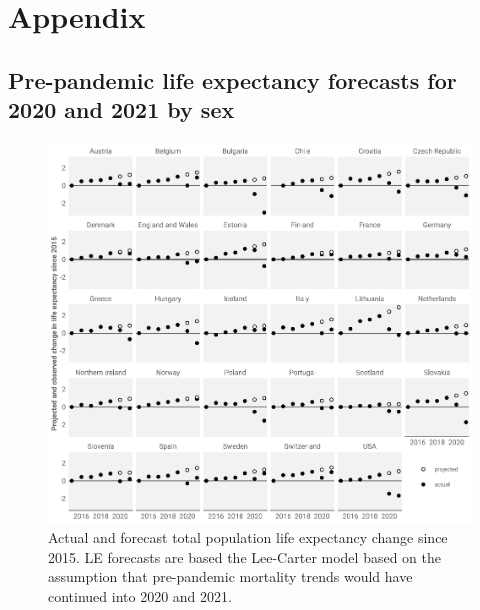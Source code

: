 \documentclass[12pt]{article}
\begin{document}
\clearpage
\section*{Appendix}

\renewcommand\thefigure{a\arabic{figure}}
\setcounter{figure}{0}
\renewcommand\thetable{a\arabic{table}}
\setcounter{table}{0}

\subsection*{Pre-pandemic life expectancy forecasts for 2020 and 2021 by sex}

\begin{figure}[ht!]
    \centering
    \includegraphics{figure-a1.pdf}
    \caption{Actual and forecast total population life expectancy change since 2015. LE forecasts are based the Lee-Carter model based on the assumption that pre-pandemic mortality trends would have continued into 2020 and 2021.}
    \label{fig:figure-a1}
\end{figure}
\end{document}
